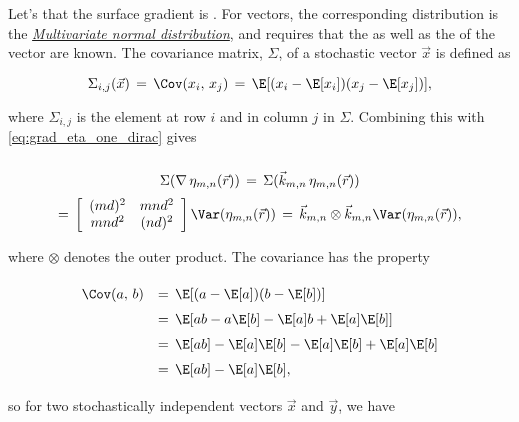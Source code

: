 {Let's \assume that the surface gradient is . For vectors, the corresponding distribution is the \textit{\href{http://en.wikipedia.org/wiki/Multivariate\_normal\_distribution\#Non-degenerate\_case}{Multivariate normal distribution}}, and requires that the \mean as well as the  of the vector are known. The covariance matrix, $\Sigma$, of a stochastic vector $\vec{x}$ is defined as

\begin{equation} \label{eq:covariance_matrix_element_definition}
\Sigma_{i,j}(\vec{x}) \,=\, \Cov(x_i,\,x_j) \,=\, \E[(x_i - \E[x_i])(x_j - \E[x_j])],
\end{equation}

where $\Sigma_{i,j}$ is the element at row $i$ and in column $j$ in $\Sigma$. Combining this with \eqref{eq:grad_eta_one_dirac} gives

\begin{equation} \label{eq:covariance_matrix_gradient_eta_mn}
\renewcommand*{\arraystretch}{2}
\begin{array}{c}
\Sigma(\nabla\,\eta_{m,n}(\vec{r})) \,=\, \Sigma(\vec{k}_{m,n}\,\eta_{m,n}(\vec{r})) \\
=\,
\left[\renewcommand*{\arraystretch}{1}
\begin{array}{cc}
(md)^2 & mnd^2 \\
mnd^2 & (nd)^2
\end{array}
\right]
\Var(\eta_{m,n}(\vec{r})) \,=\, \vec{k}_{m,n}\otimes\vec{k}_{m,n} \Var(\eta_{m,n}(\vec{r})),
\end{array}
\end{equation}

where $\otimes$ denotes the outer product. The covariance has the property

\begin{equation}
\renewcommand*{\arraystretch}{1.5}
\begin{array}{rl}
\Cov(a,\,b)
& =\, \E[(a-\E[a])(b-\E[b])] \\
& =\, \E[ab - a\E[b] - \E[a]b + \E[a]\E[b]] \\
& =\, \E[ab] - \E[a]\E[b] - \E[a]\E[b] + \E[a]\E[b] \\
& =\, \E[ab] - \E[a]\E[b],
\end{array}
\end{equation}

so for two stochastically independent vectors $\vec{x}$ and $\vec{y}$, we have

}
